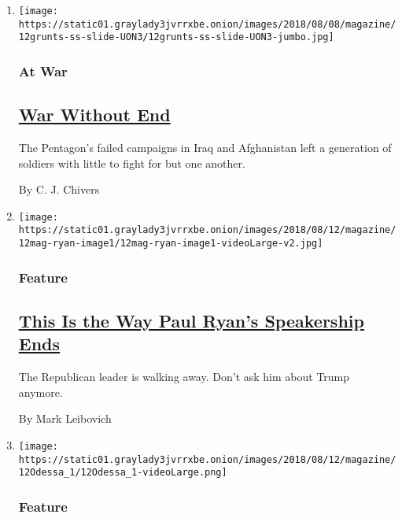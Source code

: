 \begin{enumerate}
\def\labelenumi{\arabic{enumi}.}
\item
  \texttt{[image: https://static01.graylady3jvrrxbe.onion/images/2018/08/08/magazine/12grunts-ss-slide-UON3/12grunts-ss-slide-UON3-jumbo.jpg]}

  \hypertarget{at-war}{%
  \subsubsection{At War}\label{at-war}}

  \hypertarget{war-without-end}{%
  \subsection{\texorpdfstring{\href{/2018/08/08/magazine/war-afghanistan-iraq-soldiers.html}{War
  Without End}}{War Without End}}\label{war-without-end}}

  The Pentagon's failed campaigns in Iraq and Afghanistan left a
  generation of soldiers with little to fight for but one another.

  By C. J. Chivers
\item
  \texttt{[image: https://static01.graylady3jvrrxbe.onion/images/2018/08/12/magazine/12mag-ryan-image1/12mag-ryan-image1-videoLarge-v2.jpg]}

  \hypertarget{feature}{%
  \subsubsection{Feature}\label{feature}}

  \hypertarget{this-is-the-way-paul-ryans-speakership-ends}{%
  \subsection{\texorpdfstring{\href{/2018/08/07/magazine/paul-ryan-speakership-end-trump.html}{This
  Is the Way Paul Ryan's Speakership
  Ends}}{This Is the Way Paul Ryan's Speakership Ends}}\label{this-is-the-way-paul-ryans-speakership-ends}}

  The Republican leader is walking away. Don't ask him about Trump
  anymore.

  By Mark Leibovich
\item
  \texttt{[image: https://static01.graylady3jvrrxbe.onion/images/2018/08/12/magazine/12Odessa\_1/12Odessa\_1-videoLarge.png]}

  \hypertarget{feature-1}{%
  \subsubsection{Feature}\label{feature-1}}


\end{enumerate}
